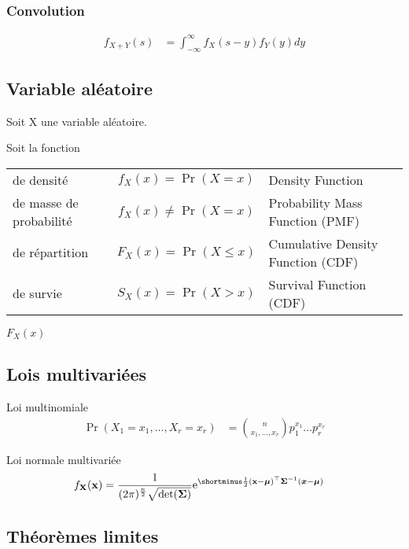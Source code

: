\documentclass[10pt, french]{article}
\begin{document}
\begin{multicols*}{2}
\subsubsection*{Convolution}
\begin{align*}
	f_{X + Y}(s)	
		&=	\int_{-\infty}^{\infty} f_{X}(s - y) f_{Y}(y) dy	
\end{align*}

\subsection*{Variable aléatoire}

Soit X une variable aléatoire.

Soit la fonction

\begin{tabular}{| l | c | l |}
\hline
	de densité	&	$f_{X}(x) = \Pr(X = x)$	&	 Density Function	\\
	de masse de probabilité	&	$f_{X}(x) \neq \Pr(X = x)$	&	Probability Mass Function (PMF)	\\
	de répartition	&	$F_{X}(x) = \Pr(X \le x)$	&	Cumulative Density Function (CDF)\\
	de survie	&	$S_{X}(x) = \Pr(X > x)$	&	Survival Function (CDF)\\\hline	
\end{tabular}
$F_{X}(x)$

\subsection*{Lois multivariées}
	
\begin{rappel}{Loi multinomiale}
\begin{align*}
	\Pr(X_{1} = x_{1}, \dots, X_{r} = x_{r})
		&=	\binom{n}{x_{1}, \dots, x_{r}} p_{1}^{x_{1}} \dots p_{r}^{x_{r}}
\end{align*}
\end{rappel}

\begin{rappel}{Loi normale multivariée}
\begin{align*}
	f_{\matr{X}}(\matr{x}) 
		&= 	\frac{1}{(2 \pi)^{\frac{n}{2}} \sqrt{\text{det}(\bm{\Sigma})}} \e{\shortminus \frac{1}{2} (\matr{x} - \bm{\mu})^{\top} \bm{\Sigma}^{-1}(\bm{x} - \bm{\mu})}
\end{align*}
\end{rappel}

\columnbreak

\subsection*{Théorèmes limites}


\end{multicols*}
\end{document}
